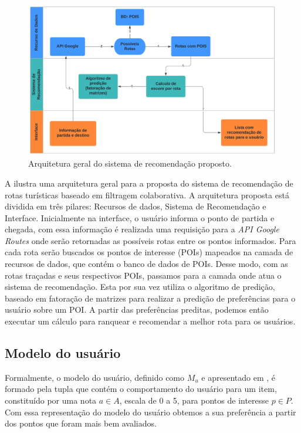 \documentclass[portuguese]{textolivre}
\begin{document}
\begin{figure}[htbp]
\centering
\begin{minipage}{1\textwidth}
\includegraphics[width=\textwidth]{imagens/fig-004.png}
\caption{Arquitetura geral do sistema de recomendação proposto.}
\label{fig-004}
\end{minipage}
\end{figure}

A  ilustra uma arquitetura geral para a proposta do sistema de recomendação de rotas turísticas baseado em filtragem colaborativa. A arquitetura proposta está dividida em três pilares: Recursos de dados, Sistema de Recomendação e Interface. Inicialmente na interface, o usuário informa o ponto de partida e chegada, com essa informação é realizada uma requisição para a \textit{API Google Routes} onde serão retornadas as possíveis rotas entre os pontos informados. Para cada rota serão buscados os pontos de interesse (POIs) mapeados na camada de recursos de dados, que contém o banco de dados de POIs. Desse modo, com as rotas traçadas e seus respectivos POIs, passamos para a camada onde atua o sistema de recomendação. Esta por sua vez utiliza o algoritmo de predição, baseado em fatoração de matrizes para realizar a predição de preferências para o usuário sobre um POI. A partir das preferências preditas, podemos então executar um cálculo para ranquear e recomendar a melhor rota para os usuários.

\subsection{Modelo do usuário}
Formalmente, o modelo do usuário, definido como $M_u$ e apresentado em , é formado pela tupla %
que contém o comportamento do usuário para um item, constituído por uma nota $a\in A$, escala de 0 a 5, para pontos de interesse $p \in P$. Com essa representação do modelo do usuário obtemos a sua preferência a partir dos pontos que foram mais bem avaliados.
\end{document}

